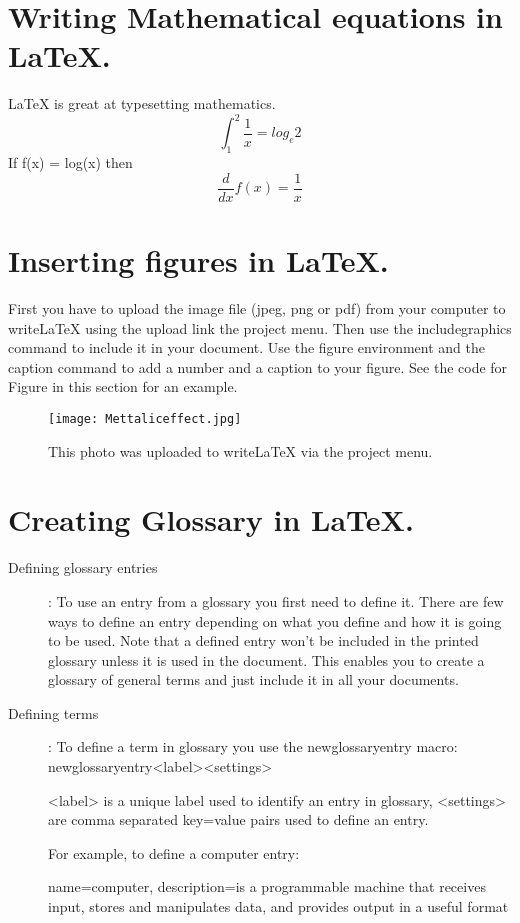 \documentclass[a4paper]{article}
\begin{document}
\section{Writing Mathematical equations in LaTeX.}

\LaTeX{} is great at typesetting mathematics.
\begin{equation}
    \int_1^2\frac{1}{x}=log_e2
\end{equation}
   If f(x) = log(x) then
\begin{equation}
    \frac{d}{dx}f(x) = \frac{1}{x}
\end{equation}
\section{Inserting figures in LaTeX.}
First you have to upload the image file (jpeg, png or pdf) from your computer to writeLaTeX using the upload link the project menu. Then use the includegraphics command to include it in your document. Use the figure environment and the caption command to add a number and a caption to your figure. See the code for Figure in this section for an example.
\begin{figure}[!h]
\centering
\texttt{[image: Mettaliceffect.jpg]}
\caption{\label{fig:Enthusia}This photo was uploaded to writeLaTeX via the project menu.}
\end{figure}
\section{Creating Glossary in LaTeX.}
\begin{description}

\item[Defining glossary entries] :
To use an entry from a glossary you first need to define it. There are few ways to define an entry depending on what you define and how it is going to be used.
Note that a defined entry won't be included in the printed glossary unless it is used in the document. This enables you to create a glossary of general terms and just include it in all your documents.

\item[Defining terms] : 
To define a term in glossary you use the newglossaryentry macro:
\\newglossaryentry{<label>}{<settings>}

<label> is a unique label used to identify an entry in glossary, 
<settings> are comma separated key=value pairs used to define an entry.

For example, to define a computer entry:

{
  name=computer, description={is a programmable machine that receives input, stores and manipulates data, and provides output in a useful format}
}

\end{description} 
\end{document}
